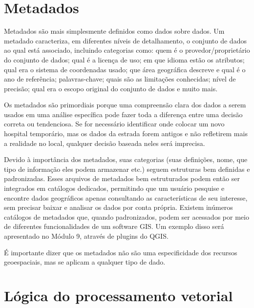 \documentclass[
  portuguese,
]{krantz}
\begin{document}
\hypertarget{metadados}{%
\section{Metadados}\label{metadados}}

Metadados são mais simplesmente definidos como dados sobre dados. Um metadado caracteriza, em diferentes níveis de detalhamento, o conjunto de dados ao qual está associado, incluindo categorias como: quem é o provedor/proprietário do conjunto de dados; qual é a licença de uso; em que idioma estão os atributos; qual era o sistema de coordenadas usado; que área geográfica descreve e qual é o ano de referência; palavras-chave; quais são as limitações conhecidas; nível de precisão; qual era o escopo original do conjunto de dados e muito mais.

Os metadados são primordiais porque uma compreensão clara dos dados a serem usados \hspace{0pt}\hspace{0pt}em uma análise específica pode fazer toda a diferença entre uma decisão correta ou tendenciosa. Se for necessário identificar onde colocar um novo hospital temporário, mas os dados da estrada forem antigos e não refletirem mais a realidade no local, qualquer decisão baseada neles será imprecisa.

Devido à importância dos metadados, suas categorias (suas definições, nome, que tipo de informação eles podem armazenar etc.) seguem estruturas bem definidas e padronizadas. Esses arquivos de metadados bem estruturados podem então ser integrados em catálogos dedicados, permitindo que um usuário pesquise e encontre dados geográficos apenas consultando as características de seu interesse, sem precisar baixar e analisar os dados por conta própria. Existem inúmeros catálogos de metadados que, quando padronizados, podem ser acessados \hspace{0pt}\hspace{0pt}por meio de diferentes funcionalidades de um software GIS. Um exemplo disso será apresentado no Módulo 9, através de plugins do QGIS.

É importante dizer que os metadados não são uma especificidade dos recursos geoespaciais, mas se aplicam a qualquer tipo de dado.

\hypertarget{luxf3gica-do-processamento-vetorial}{%
\section{Lógica do processamento vetorial}\label{luxf3gica-do-processamento-vetorial}}
\end{document}
